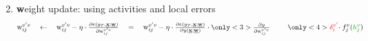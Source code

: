 \begin{frame}
\begin{enumerate}
\begin{eqnarray*}
				\end{eqnarray*}
		\pause 
		\vspace{-1mm}
		\item {\textbf weight update}: using activities and local errors
			$$
				\mathrm{w}_{ij}^{v'v}
				\quad \leftarrow \quad 
				\mathrm{w}_{ij}^{v'v} - \eta \cdot
				\smallfrac{\partial e\left(y_T, \vec x; \vec w\right)}{\partial\mathrm{w}_{ij}^{v'v}}
				\quad=\quad \mathrm{w}_{ij}^{v'v} - \eta \cdot
				\smallfrac{\partial e\left(y_T, \vec x; \vec w\right)}{\partial y(\vec{x}; \vec{w})} \cdot
				\only<3>{\smallfrac{\partial y}{\partial\mathrm{w}_{ij}^{v'v}}\hspace{8.5mm}}
				\only<4>{{\color{red} \delta_i^{v'}} \kern-.5ex\cdot
			   			f_j^v( {\color{darkgreen}h_j^v} ) }
			$$
	\end{enumerate}
\end{frame}

